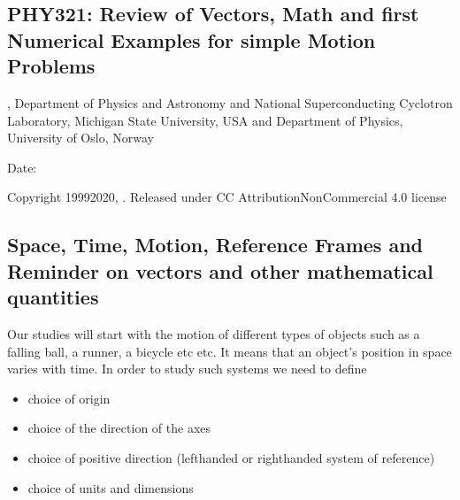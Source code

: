 \documentclass[letterpaper,10pt,english]{sphinxmanual}
\begin{document}
\subsection{PHY321: Review of Vectors, Math and first Numerical Examples for simple Motion Problems}
\label{\detokenize{chapter2:phy321-review-of-vectors-math-and-first-numerical-examples-for-simple-motion-problems}}\label{\detokenize{chapter2::doc}}




, Department of Physics and Astronomy and National Superconducting Cyclotron Laboratory, Michigan State University, USA and Department of Physics, University of Oslo, Norway









Date: 

Copyright 1999\sphinxhyphen{}2020, . Released under CC Attribution\sphinxhyphen{}NonCommercial 4.0 license


\subsection{Space, Time, Motion, Reference Frames  and Reminder on vectors and other mathematical quantities}
\label{\detokenize{chapter2:space-time-motion-reference-frames-and-reminder-on-vectors-and-other-mathematical-quantities}}
Our studies will start with the motion of different types of objects
such as a falling ball, a runner, a bicycle etc etc. It means that an
object’s position in space varies with time.
In order to study such systems we need to define
\begin{itemize}
\item {} 
choice of origin

\item {} 
choice of the direction of the axes

\item {} 
choice of positive direction (left\sphinxhyphen{}handed or right\sphinxhyphen{}handed system of reference)

\item {} 
choice of units and dimensions

\end{itemize}
\end{document}
